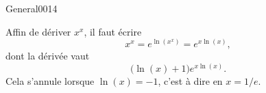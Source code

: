 \begin{corrige}{General0014}

Affin de dériver $x^x$, il faut écrire
\begin{equation}
	x^x= e^{\ln(x^x)}= e^{x\ln(x)},
\end{equation}
dont la dérivée vaut
\begin{equation}
	\big( \ln(x)+1 \big) e^{x\ln(x)}.
\end{equation}
Cela s'annule lorsque $\ln(x)=-1$, c'est à dire en $x=1/e$.

\end{corrige}
